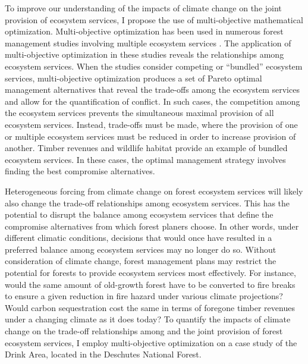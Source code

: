 To improve our understanding of the impacts of climate change on the joint provision of ecosystem services, I propose the use of multi-objective mathematical optimization. Multi-objective optimization has been used in numerous forest management studies involving multiple ecosystem services \cite{schroder2016multi}\cite{toth2009finding}\cite{diaz2008making}\cite{borges2014addressing}. The application of multi-objective optimization in these studies reveals the relationships among ecosystem services. When the studies consider competing or ``bundled'' ecosystem services, multi-objective optimization produces a set of Pareto optimal management alternatives that reveal the trade-offs among the ecosystem services and allow for the quantification of conflict. In such cases, the competition among the ecosystem services prevents the simultaneous maximal provision of all ecosystem services. Instead, trade-offs must be made, where the provision of one or multiple ecosystem services must be reduced in order to increase provision of another. Timber revenues and wildlife habitat provide an example of bundled ecosystem services. In these cases, the optimal management strategy involves finding the best compromise alternatives.

Heterogeneous forcing from climate change on forest ecosystem services will likely also change the trade-off relationships among ecosystem services. This has the potential to disrupt the balance among ecosystem services that define the compromise alternatives from which forest planers choose. In other words, under different climatic conditions, decisions that would once have resulted in a preferred balance among ecosystem services may no longer do so. Without consideration of climate change, forest management plans may restrict the potential for forests to provide ecosystem services most effectively. For instance, would the same amount of old-growth forest have to be converted to fire breaks to ensure a given reduction in fire hazard under various climate projections? Would carbon sequestration cost the same in terms of foregone timber revenues under a changing climate as it does today? To quantify the impacts of climate change on the trade-off relationships among and the joint provision of forest ecosystem services, I employ multi-objective optimization on a case study of the Drink Area, located in the Deschutes National Forest.

